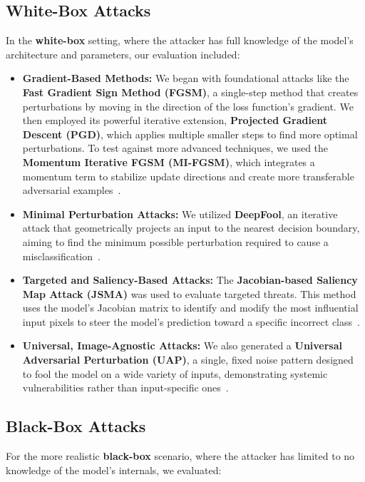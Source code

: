 \documentclass[conference]{IEEEtran}
\begin{document}
\subsection*{White-Box Attacks}
In the \textbf{white-box} setting, where the attacker has full knowledge of the model's architecture and parameters, our evaluation included:

\begin{itemize}
    \item \textbf{Gradient-Based Methods:} We began with foundational attacks like the \textbf{Fast Gradient Sign Method (FGSM)}, a single-step method that creates perturbations by moving in the direction of the loss function's gradient. We then employed its powerful iterative extension, \textbf{Projected Gradient Descent (PGD)}, which applies multiple smaller steps to find more optimal perturbations. To test against more advanced techniques, we used the \textbf{Momentum Iterative FGSM (MI-FGSM)}, which integrates a momentum term to stabilize update directions and create more transferable adversarial examples~\cite{goodfellow2015explaining,madry2018towardspgd,dong2018boosting}.

    \item \textbf{Minimal Perturbation Attacks:} We utilized \textbf{DeepFool}, an iterative attack that geometrically projects an input to the nearest decision boundary, aiming to find the minimum possible perturbation required to cause a misclassification~\cite{moosavidezfooli2016deepfoolsimpleaccuratemethod}.

    \item \textbf{Targeted and Saliency-Based Attacks:} The \textbf{Jacobian-based Saliency Map Attack (JSMA)} was used to evaluate targeted threats. This method uses the model's Jacobian matrix to identify and modify the most influential input pixels to steer the model's prediction toward a specific incorrect class~\cite{papernot2016limitations}.

    \item \textbf{Universal, Image-Agnostic Attacks:} We also generated a \textbf{Universal Adversarial Perturbation (UAP)}, a single, fixed noise pattern designed to fool the model on a wide variety of inputs, demonstrating systemic vulnerabilities rather than input-specific ones~\cite{moosavidezfooli2017universaladversarialperturbations}.
\end{itemize}

\subsection*{Black-Box Attacks}
For the more realistic \textbf{black-box} scenario, where the attacker has limited to no knowledge of the model's internals, we evaluated:
\end{document}
